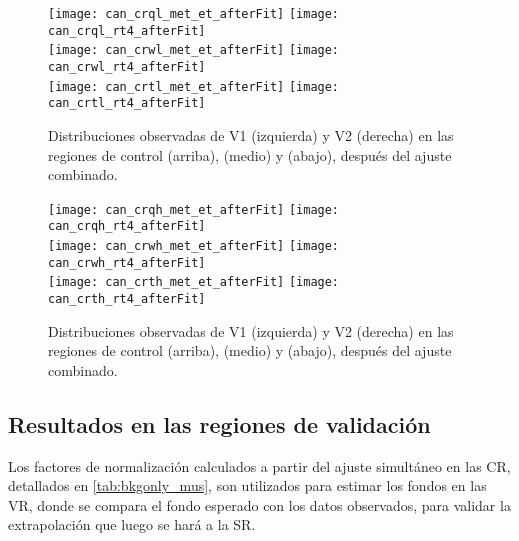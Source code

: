 \begin{figure}[!htbp]
  \centering

  \texttt{[image: can\_crql\_met\_et\_afterFit]}
  \texttt{[image: can\_crql\_rt4\_afterFit]} \\

  \texttt{[image: can\_crwl\_met\_et\_afterFit]}
  \texttt{[image: can\_crwl\_rt4\_afterFit]} \\

  \texttt{[image: can\_crtl\_met\_et\_afterFit]}
  \texttt{[image: can\_crtl\_rt4\_afterFit]} \\

   \caption{Distribuciones observadas de V1 (izquierda) y V2 (derecha) en las
     regiones de control {\CRQL} (arriba), {\CRWL} (medio) y {\CRTL} (abajo),
     después del ajuste combinado.}
   \label{fig:bkgfit_crl_after}

\end{figure}


\begin{figure}[!htbp]
  \centering

  \texttt{[image: can\_crqh\_met\_et\_afterFit]}
  \texttt{[image: can\_crqh\_rt4\_afterFit]} \\

  \texttt{[image: can\_crwh\_met\_et\_afterFit]}
  \texttt{[image: can\_crwh\_rt4\_afterFit]} \\

  \texttt{[image: can\_crth\_met\_et\_afterFit]}
  \texttt{[image: can\_crth\_rt4\_afterFit]} \\

  \caption{Distribuciones observadas de V1 (izquierda) y V2 (derecha) en las
    regiones de control {\CRQH} (arriba), {\CRWH} (medio) y {\CRTH} (abajo),
    después del ajuste combinado.}
  \label{fig:bkgfit_crh_after}

\end{figure}





\subsection{Resultados en las regiones de validación}

Los factores de normalización calculados a partir del ajuste simultáneo en las CR,
detallados en \cref{tab:bkgonly_mus}, son utilizados para estimar los fondos en las
VR, donde se compara el fondo esperado con los datos observados, para validar
la extrapolación que luego se hará a la SR.

